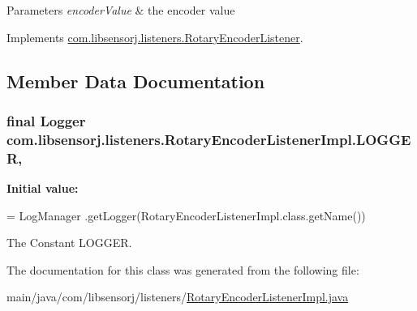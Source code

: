 \begin{DoxyParams}{Parameters}
{\em encoder\+Value} & the encoder value \\
\hline
\end{DoxyParams}


Implements \hyperlink{interfacecom_1_1libsensorj_1_1listeners_1_1RotaryEncoderListener_aa04a814b5886e2fd2c095a8c2827b6a8}{com.\+libsensorj.\+listeners.\+Rotary\+Encoder\+Listener}.



\subsection{Member Data Documentation}
\hypertarget{classcom_1_1libsensorj_1_1listeners_1_1RotaryEncoderListenerImpl_af88de2de8fdc7d0d31d454648560aa41}{}
\subsubsection[{L\+O\+G\+G\+E\+R}]{\setlength{\rightskip}{0pt plus 5cm}final Logger com.\+libsensorj.\+listeners.\+Rotary\+Encoder\+Listener\+Impl.\+L\+O\+G\+G\+E\+R\hspace{0.3cm}{\ttfamily [static]}, {\ttfamily [private]}}\label{classcom_1_1libsensorj_1_1listeners_1_1RotaryEncoderListenerImpl_af88de2de8fdc7d0d31d454648560aa41}
{\bfseries Initial value\+:}
\begin{DoxyCode}
= LogManager
            .getLogger(RotaryEncoderListenerImpl.class.getName())
\end{DoxyCode}
The Constant L\+O\+G\+G\+E\+R. 

The documentation for this class was generated from the following file\+:\begin{DoxyCompactItemize}
\item 
main/java/com/libsensorj/listeners/\hyperlink{RotaryEncoderListenerImpl_8java}{Rotary\+Encoder\+Listener\+Impl.\+java}\end{DoxyCompactItemize}
